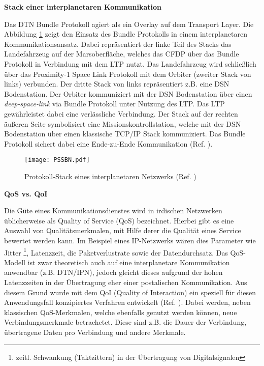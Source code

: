 \textbf{Stack einer interplanetaren Kommunikation}

Das \gls{DTN} Bundle Protokoll agiert als ein Overlay auf dem Transport Layer. Die
Abbildung \ref{fig:PSSBN} zeigt den Einsatz des Bundle Protokolls in einem
interplanetaren Kommunikationsansatz.
Dabei repr{\"a}sentiert der linke Teil des Stacks das Landefahrzeug auf der
Marsoberfl{\"a}che, welches das \gls{CFDP} {\"u}ber das Bundle Protokoll in
Verbindung mit dem \gls{LTP} nutzt.
Das Landefahrzeug wird schlie{\ss}lich {\"u}ber das Proximity-1 Space Link
Protokoll mit dem Orbiter (zweiter Stack von links) verbunden. Der dritte Stack
von links repr{\"a}sentiert z.B. eine \gls{DSN} Bodenstation. Der
Orbiter kommuniziert mit der \gls{DSN} Bodenstation {\"u}ber einen
\textit{deep-space-link} via Bundle Protokoll unter Nutzung des \gls{LTP}. Das
\gls{LTP} gew{\"a}hrleistet dabei eine verl{\"a}ssliche Verbindung. Der Stack
auf der rechten {\"a}u{\ss}eren Seite symbolisiert eine Missionskontrollstation,
welche mit der \gls{DSN} Bodenstation {\"u}ber einen klassische
\gls{TCP}/\gls{IP} Stack kommuniziert. Das Bundle Protokoll sichert dabei eine
Ende-zu-Ende Kommunikation (Ref. \cite{DTNBundle}).

\begin{figure}[H]
\centering
\texttt{[image: PSSBN.pdf]}
\caption[Protokoll-Stack eines interplanetaren Netzwerks]
{Protokoll-Stack eines interplanetaren Netzwerks (Ref. \cite{DTNBundle})}
\label{fig:PSSBN}
\end{figure}

\textbf{\gls{QoS} vs. \gls{QoI}}

Die G{\"u}te eines Kommunikationsdienstes wird in irdischen Netzwerken
{\"u}blicherweise als Quality of Service (QoS) bezeichnet. Hierbei gibt es eine
Auswahl von Qualit{\"a}tsmerkmalen, mit Hilfe derer die Qualit{\"a}t eines
Service bewertet werden kann. Im Beispiel eines IP-Netzwerks w{\"a}ren dies
Parameter wie Jitter \footnote{zeitl. Schwankung (Taktzittern) in der
{\"U}bertragung von Digitalsignalen}, Latenzzeit, die Paketverlustrate sowie der Datendurchsatz.
Das QoS-Modell ist zwar theoretisch auch auf eine interplanetare Kommunikation
anwendbar (z.B. DTN/IPN), jedoch gleicht dieses aufgrund der hohen Latenzzeiten
in der {\"U}bertragung eher einer postalischen Kommunikation. Aus diesem Grund
wurde mit dem QoI (Quality of Interaction) ein speziell f{\"u}r diesen
Anwendungsfall konzipiertes Verfahren entwickelt (Ref. \cite{Daher2}). Dabei
werden, neben klassischen QoS-Merkmalen, welche ebenfalls genutzt werden
k{\"o}nnen, neue Verbindungsmerkmale betrachetet. Diese sind z.B. die
Dauer der Verbindung, {\"u}bertragene Daten pro Verbindung und andere Merkmale. 

